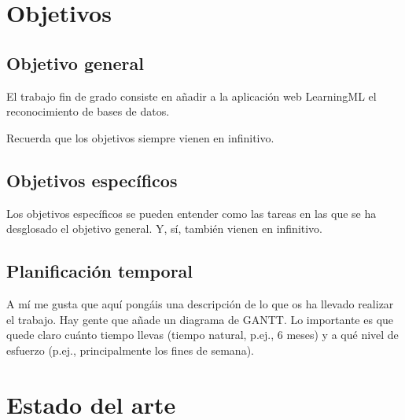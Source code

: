 \documentclass[a4paper, 12pt]{book}
\begin{document}
\cleardoublepage %
\chapter{Objetivos} %
\label{chap:objetivos} %

\section{Objetivo general} %
\label{sec:objetivo-general} %

El trabajo fin de grado consiste en añadir a la aplicación web LearningML el reconocimiento de bases de datos.

Recuerda que los objetivos siempre vienen en infinitivo.


\section{Objetivos específicos}
\label{sec:objetivos-especificos}

Los objetivos específicos se pueden entender como las tareas en las que se ha desglosado el objetivo general.
Y, sí, también vienen en infinitivo.


\section{Planificación temporal}
\label{sec:planificacion-temporal}

A mí me gusta que aquí pongáis una descripción de lo que os ha llevado realizar el trabajo.
Hay gente que añade un diagrama de GANTT.
Lo importante es que quede claro cuánto tiempo llevas (tiempo natural, p.ej., 6 meses) y a qué nivel de esfuerzo (p.ej., principalmente los fines de semana).



\cleardoublepage
\chapter{Estado del arte}
\label{chap:estado}
\end{document}
